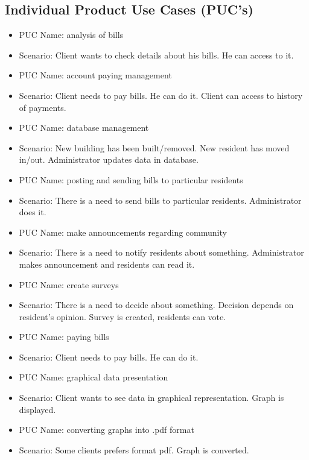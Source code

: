 \documentclass[a4paper,10pt]{report}
\begin{document}
\subsection{Individual Product Use Cases (PUC’s)}

\begin{itemize}
\item PUC Name: analysis of bills
\item Scenario: Client wants to check details about his bills. He can access to it.


\item PUC Name: account paying management
\item Scenario: Client needs to pay bills. He can do it. Client can access to history of payments.

\item PUC Name: database management
\item Scenario: New building has been built/removed. New resident has moved in/out. Administrator updates data in database.

\item PUC Name: posting and sending bills to particular residents
\item Scenario: There is a need to send bills to particular residents. Administrator does it.

\item PUC Name: make announcements regarding community
\item Scenario: There is a need to notify residents about something. Administrator makes announcement and residents can read it.

\item PUC Name: create surveys
\item Scenario: There is a need to decide about something. Decision depends on resident's opinion. Survey is created, residents can vote.

\item PUC Name: paying bills
\item Scenario: Client needs to pay bills. He can do it.

\item PUC Name: graphical data presentation
\item Scenario: Client wants to see data in graphical representation. Graph is displayed.

\item PUC Name: converting graphs into .pdf format
\item Scenario: Some clients prefers format pdf. Graph is converted.


\end{itemize}
\end{document}
